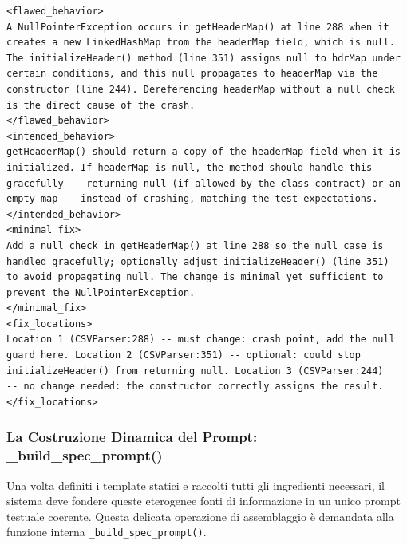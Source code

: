 \begin{lstlisting}
<flawed_behavior>
A NullPointerException occurs in getHeaderMap() at line 288 when it
creates a new LinkedHashMap from the headerMap field, which is null.
The initializeHeader() method (line 351) assigns null to hdrMap under
certain conditions, and this null propagates to headerMap via the
constructor (line 244). Dereferencing headerMap without a null check
is the direct cause of the crash.
</flawed_behavior>
<intended_behavior>
getHeaderMap() should return a copy of the headerMap field when it is
initialized. If headerMap is null, the method should handle this
gracefully -- returning null (if allowed by the class contract) or an
empty map -- instead of crashing, matching the test expectations.
</intended_behavior>
<minimal_fix>
Add a null check in getHeaderMap() at line 288 so the null case is
handled gracefully; optionally adjust initializeHeader() (line 351)
to avoid propagating null. The change is minimal yet sufficient to
prevent the NullPointerException.
</minimal_fix>
<fix_locations>
Location 1 (CSVParser:288) -- must change: crash point, add the null
guard here. Location 2 (CSVParser:351) -- optional: could stop
initializeHeader() from returning null. Location 3 (CSVParser:244)
-- no change needed: the constructor correctly assigns the result.
</fix_locations>
\end{lstlisting}


\subsubsection{La Costruzione Dinamica del Prompt: \_build\_spec\_prompt()}
\label{subsubsec:3_3_3_4}
Una volta definiti i template statici e raccolti tutti
gli ingredienti necessari, il sistema deve fondere queste eterogenee
fonti di informazione in un unico prompt testuale coerente.
Questa delicata operazione di assemblaggio è demandata alla funzione
interna \texttt{\_build\_spec\_prompt()}.


